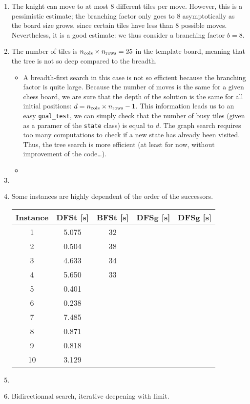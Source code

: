 \documentclass[a4paper,10pt]{article}
\newcommand{\py}[1]{\texttt{#1}}
\begin{document}
\begin{enumerate}
 \item The knight can move to at most 8 different tiles per move.
 However, this is a pessimistic estimate; the branching factor only goes to 8 asymptotically as the board size grows, since certain tiles have less than 8 possible moves.
 Nevertheless, it is a good estimate: we thus consider a branching factor $b = 8$.
 \item The number of tiles is $n_{\textnormal{cols}} \times n_{\vphantom{l}\textnormal{rows}} = 25$ in the template board, meaning that the tree is not so deep compared to the breadth.
 \begin{itemize}
  \item A breadth-first search in this case is not so efficient because the branching factor is quite large.
  Because the number of moves is the same for a given chess board, we are sure that the depth of the solution is the same for all initial positions: $d = n_{\textnormal{cols}} \times n_{\textnormal{rows}} - 1$.
  This information leads us to an easy \py{goal_test}, we can simply check that the number of busy tiles (given as a paramer of the \py{state} class) is equal to $d$.
  The graph search requires too many computations to check if a new state has already been visited.
  Thus, the tree search is more efficient (at least for now, without improvement of the code\ldots).
  \item 
 \end{itemize}
 \item 
 \item Some instances are highly dependent of the order of the successors.
 
 

\begin{center}
\begin{tabular}{ccccc} 
 \toprule
  Instance & DFSt [s] & BFSt [s] & DFSg [s] & DFSg [s]\\
  \midrule
 1 & 5.075 & 32 & & \\ 
 2 & 0.504 & 38 & & \\ 
 3 & 4.633 & 34 & & \\ 
 4 & 5.650 & 33 & & \\ 
 5 & 0.401 & & & \\ 
 6 & 0.238 & & & \\ 
 7 & 7.485 & & & \\ 
 8 & 0.871 & & & \\ 
 9 & 0.818 & & & \\  
 10 & 3.129 & & & \\ 
 \bottomrule
\end{tabular}
\end{center}



 \item 
 \item Bidirectionnal search, iterative deepening with limit.
\end{enumerate}
\end{document}
